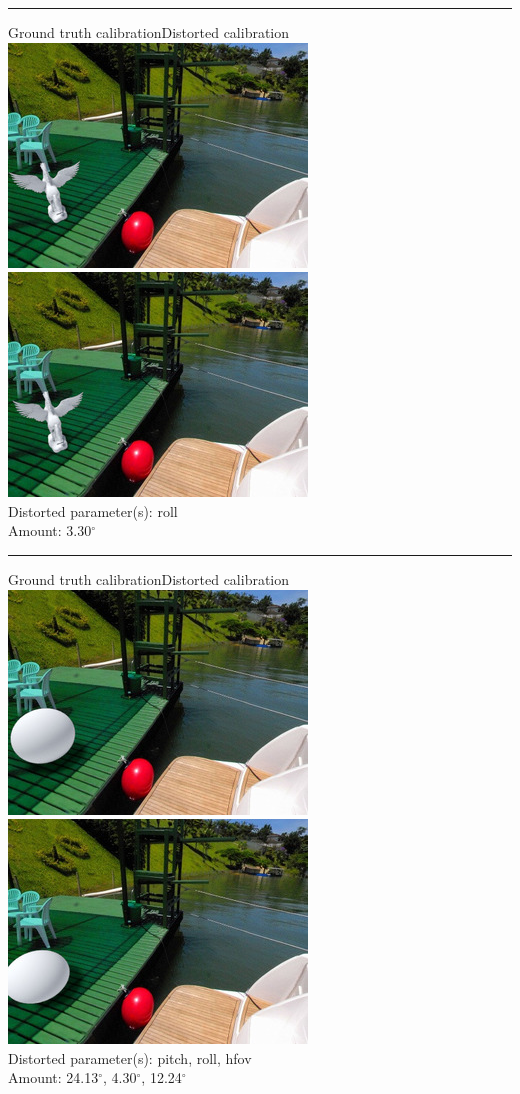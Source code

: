 \begin{minipage}{\linewidth}
\centering
\hrule\vspace{1em}
Ground truth calibration\hspace{0.2\linewidth}Distorted calibration\
\includegraphics[width=0.45\linewidth]{study/thumb/pano_ahxngxlbcrplaw-6_1_gt.jpg}
\includegraphics[width=0.45\linewidth]{study/thumb/pano_ahxngxlbcrplaw-6_1_dc.jpg}\\
Distorted parameter(s): roll\\
Amount: 3.30$^\circ$
\end{minipage}

\begin{minipage}{\linewidth}
\centering
\hrule\vspace{1em}
Ground truth calibration\hspace{0.2\linewidth}Distorted calibration\
\includegraphics[width=0.45\linewidth]{study/thumb/pano_ahxngxlbcrplaw-6_2_gt.jpg}
\includegraphics[width=0.45\linewidth]{study/thumb/pano_ahxngxlbcrplaw-6_2_dc.jpg}\\
Distorted parameter(s): pitch, roll, hfov\\
Amount: 24.13$^\circ$, 4.30$^\circ$, 12.24$^\circ$
\end{minipage}

